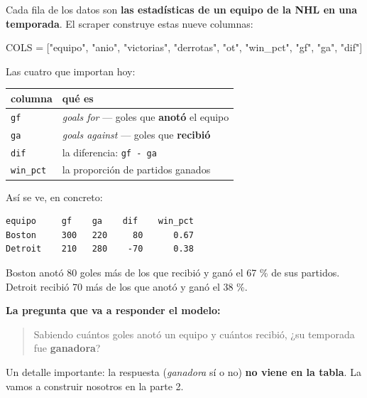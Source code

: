 \documentclass[
]{article}
\newenvironment{Shaded}{}{}
\newcommand{\NormalTok}[1]{#1}
\newcommand{\OperatorTok}[1]{\textcolor[rgb]{0.40,0.40,0.40}{#1}}
\newcommand{\StringTok}[1]{\textcolor[rgb]{0.25,0.44,0.63}{#1}}
\newcounter{none} %
\begin{document}
Cada fila de los datos son \textbf{las estadísticas de un equipo de la
NHL en una temporada}. El scraper construye estas nueve columnas:

\begin{Shaded}
\begin{Highlighting}[]
\NormalTok{COLS }\OperatorTok{=}\NormalTok{ [}\StringTok{"equipo"}\NormalTok{, }\StringTok{"anio"}\NormalTok{, }\StringTok{"victorias"}\NormalTok{, }\StringTok{"derrotas"}\NormalTok{, }\StringTok{"ot"}\NormalTok{,}
        \StringTok{"win\_pct"}\NormalTok{, }\StringTok{"gf"}\NormalTok{, }\StringTok{"ga"}\NormalTok{, }\StringTok{"dif"}\NormalTok{]}
\end{Highlighting}
\end{Shaded}

Las cuatro que importan hoy:

{\def\LTcaptype{none} %
\begin{longtable}[]{@{}ll@{}}
\toprule\noalign{}
columna & qué es \\
\midrule\noalign{}
\endhead
\bottomrule\noalign{}
\endlastfoot
\texttt{gf} & \emph{goals for} --- goles que \textbf{anotó} el equipo \\
\texttt{ga} & \emph{goals against} --- goles que \textbf{recibió} \\
\texttt{dif} & la diferencia: \texttt{gf\ -\ ga} \\
\texttt{win\_pct} & la proporción de partidos ganados \\
\end{longtable}
}

Así se ve, en concreto:

\begin{verbatim}
equipo     gf    ga    dif    win_pct
Boston     300   220     80      0.67
Detroit    210   280    -70      0.38
\end{verbatim}

Boston anotó 80 goles más de los que recibió y ganó el 67 \% de sus
partidos. Detroit recibió 70 más de los que anotó y ganó el 38 \%.

\textbf{La pregunta que va a responder el modelo:}

\begin{quote}
Sabiendo cuántos goles anotó un equipo y cuántos recibió, ¿su temporada
fue \textbf{ganadora}?
\end{quote}

Un detalle importante: la respuesta (\emph{ganadora} sí o no) \textbf{no
viene en la tabla}. La vamos a construir nosotros en la parte 2.
\end{document}
